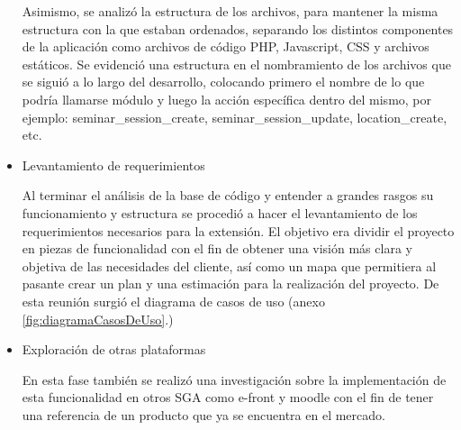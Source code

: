 \begin{itemize}
Asimismo, se analizó la estructura de los archivos, para mantener la misma estructura con la que estaban ordenados, separando los distintos componentes de la aplicación como archivos de código PHP, Javascript, CSS y archivos estáticos. Se evidenció una estructura en el nombramiento de los archivos que se siguió a lo largo del desarrollo, colocando primero el nombre de lo que podría llamarse módulo y luego la acción específica dentro del mismo, por ejemplo: seminar\_session\_create, seminar\_session\_update, location\_create, etc.

\item Levantamiento de requerimientos

Al terminar el análisis de la base de código y entender a grandes rasgos su funcionamiento y estructura se procedió a hacer el levantamiento de los requerimientos necesarios para la extensión. El objetivo era dividir el proyecto en piezas de funcionalidad con el fin de obtener una visión más clara y objetiva de las necesidades del cliente, así como un mapa que permitiera al pasante crear un plan y una estimación para la realización del proyecto. De esta reunión surgió el diagrama de casos de uso (anexo \ref{fig:diagramaCasosDeUso}.)

\item Exploración de otras plataformas

En esta fase también se realizó una investigación sobre la implementación de esta funcionalidad en otros SGA como e-front y moodle con el fin de tener una referencia de un producto que ya se encuentra en el mercado.

\end{itemize}







